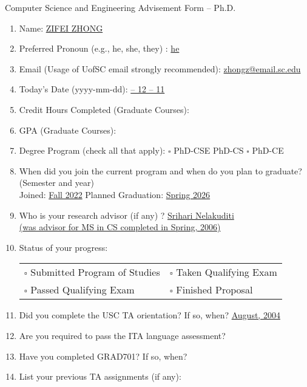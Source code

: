 \documentclass[11pt, oneside]{article}   	%
\begin{document}
\newpage
\centering \Large Computer Science and Engineering Advisement Form -- Ph.D.

\vspace{30pt}

\begin{enumerate}
\item Name: \underline{\quad ZIFEI ZHONG \quad}
\item Preferred Pronoun (e.g., he, she, they) : \underline{\quad he \quad}
\item Email (Usage of UofSC email strongly recommended): \underline{\quad zhongz@email.sc.edu \quad}
\item Today's Date (yyyy-mm-dd): \underline{ -- 12 -- 11 \quad}
\item Credit Hours Completed (Graduate Courses): \underline{ \quad}
\item GPA (Graduate Courses): \underline{ \quad}
\item Degree Program (check all that apply): $\square$ PhD-CSE \quad \makebox[0pt][l]{$\square$}\raisebox{.15ex}{\hspace{0.1em}$\checkmark$}  PhD-CS \quad $\square$ PhD-CE
\item When did you join the current program and when do you plan to graduate? (Semester and year)\\
 Joined: \underline{\quad Fall 2022\quad } \qquad Planned Graduation: \underline{\quad Spring 2026\quad}
\item Who is your research advisor (if any) ? \underline{\quad Srihari Nelakuditi \quad }\\
\underline{\quad (was advisor for MS in CS completed in Spring, 2006) \quad}
\item Status of your progress:\\
\begin{tabular}{l l}
$\square$ Submitted Program of Studies & $\square$ Taken Qualifying Exam\\
$\square$ Passed Qualifying Exam & $\square$ Finished Proposal
\end{tabular}
\item Did you complete the USC TA orientation? If so, when? \underline{\qquad August, 2004\qquad}
\item Are you required to pass the ITA language assessment? \underline{\qquad\qquad}
\item Have you completed GRAD701? If so, when? \underline{\qquad\qquad}
\item List your previous TA assignments (if any): 


\end{enumerate}
\end{document}
